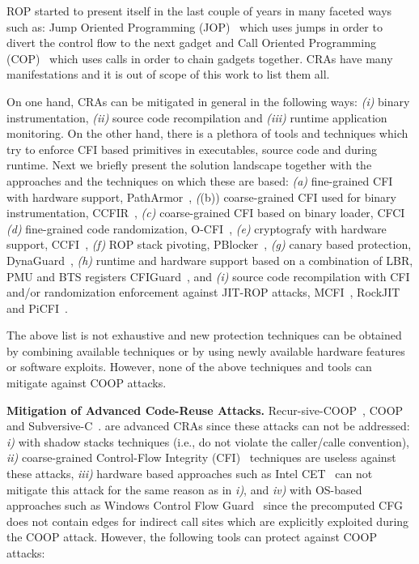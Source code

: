 ROP started to present itself in the last couple of years in many faceted ways such as:
Jump Oriented Programming (JOP)~\cite{JOP1, JOP2, JOP3} which uses jumps in order to divert the control flow to the next gadget and 
Call Oriented Programming (COP)~\cite{rop:carlini} which uses calls in order to chain gadgets together.
CRAs have many manifestations and it is out of scope of this work to list them all.

On one hand, CRAs can be mitigated in general in the following ways: 
\textit{(i)} binary instrumentation,
\textit{(ii)} source code recompilation and 
\textit{(iii)} runtime application monitoring.
On the other hand, there is a plethora of tools and techniques which try to enforce CFI based
primitives in executables, source code and during runtime. Next we briefly
present the solution landscape together with the approaches and the techniques on which these are based:
\textit{(a)} fine-grained CFI with hardware support, PathArmor~\cite{veen:cfi},
\textit((b)) coarse-grained CFI used for binary instrumentation, CCFIR~\cite{ccfir:zhang},
\textit{(c)} coarse-grained CFI based on binary loader, CFCI~\cite{cfci:zhang}
\textit{(d)} fine-grained code randomization, O-CFI~\cite{mohan:opaque},
\textit{(e)} cryptografy with hardware support, CCFI~\cite{ccfi:jose},
\textit{(f)} ROP stack pivoting, PBlocker~\cite{pblocker:prakash},
\textit{(g)} canary based protection, DynaGuard~\cite{dynaguard:petsios},
\textit{(h)} runtime and hardware support based on a combination of LBR, PMU and BTS registers CFIGuard~\cite{cfiguard:yuan}, and
\textit{(i)} source code recompilation with CFI and/or randomization enforcement against JIT-ROP attacks, MCFI~\cite{mcfi:niu}, 
RockJIT~\cite{rockjit:niu} and PiCFI~\cite{perinput:niu}.

The above list is not exhaustive and new protection techniques can be obtained by combining available techniques
or by using newly available hardware features or software exploits. However, none of the above techniques and tools 
can mitigate against COOP attacks.


\textbf{Mitigation of Advanced Code-Reuse Attacks.}
\label{Mitigation of Advanced Code-Reuse Attacks}
Recur-sive-COOP~\cite{crane:readactor++}, COOP~\cite{schuster:coop} and Subversive-C~\cite{subversive-c:lettner}.
are advanced CRAs since these attacks can not be addressed:
\textit{i)}  with shadow stacks techniques (i.e., do not violate the caller/calle convention), 
\textit{ii)} coarse-grained Control-Flow Integrity (CFI)~\cite{abadi:cfi2, abadi:cfi} techniques are useless against these attacks, 
\textit{iii)} hardware based approaches such as Intel CET~\cite{intel:cet} can not mitigate this attack for the same reason as in \textit{i)}, and 
\textit{iv)} with OS-based approaches such as Windows Control Flow Guard~\cite{windows:cfguard} 
since the precomputed CFG does not contain edges for indirect call sites which are explicitly exploited during the COOP attack.
However, the following tools can protect against COOP attacks:

